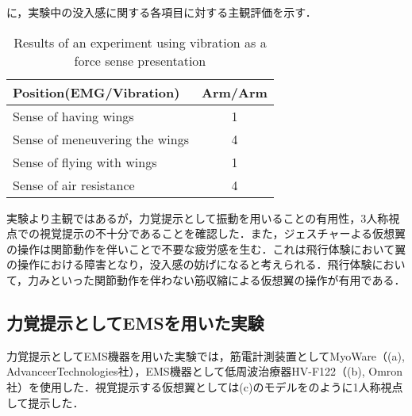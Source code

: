     に，実験中の没入感に関する各項目に対する主観評価を示す．
        \begin{table}[h]
            \begin{center}
                \caption{Results of an experiment using vibration as a force sense presentation}
                \scalebox{0.75}
                {
                    \begin{tabular}{l|c}
                        \hline
                        Position(EMG/Vibration) & Arm/Arm \\\hline
                        Sense of having wings & 1 \\
                        Sense of meneuvering the wings & 4 \\
                        Sense of flying with wings & 1 \\
                        Sense of air resistance & 4 \\\hline
                    \end{tabular}
                }
            \end{center}
        \end{table}
    

        実験より主観ではあるが，力覚提示として振動を用いることの有用性，3人称視点での視覚提示の不十分であることを確認した．また，ジェスチャーよる仮想翼の操作は関節動作を伴いことで不要な疲労感を生む．これは飛行体験において翼の操作における障害となり，没入感の妨げになると考えられる．飛行体験において，力みといった関節動作を伴わない筋収縮による仮想翼の操作が有用である．

        \subsection{力覚提示としてEMSを用いた実験}


        力覚提示としてEMS機器を用いた実験では，筋電計測装置としてMyoWare（(a), AdvanceerTechnologies社），EMS機器として低周波治療器HV-F122（(b), Omron社）を使用した．視覚提示する仮想翼としては(c)のモデルをのように1人称視点して提示した．

